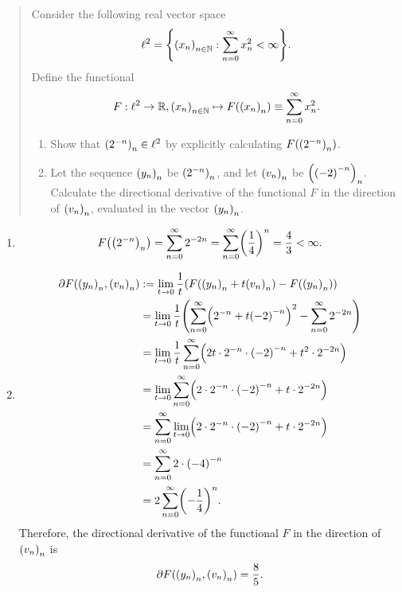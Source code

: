 \documentclass{exercise}
\begin{document}
	\section{}

	\begin{quote}
		Consider the following real vector space
		\[
			\ell^2 = \braces*{\parentheses*{x_n}_{n \in \N} : \sum_{n = 0}^\infty x_n^2 < \infty}.
		\]
		Define the functional
		\[
			F: \ell^2 \to \R, \parentheses*{x_n}_{n \in \N} \mapsto F\parentheses*{\parentheses*{x_n}_n} \equiv \sum_{n = 0}^\infty x_n^2.
		\]
		\begin{enumerate}
			\item Show that \(\parentheses*{2^{-n}}_n \in \ell^2\) by explicitly calculating \(F\parentheses*{\parentheses*{2^{-n}}_n}\).
			\item Let the sequence \(\parentheses*{y_n}_n\) be \(\parentheses*{2^{-n}}_n\), and let \(\parentheses*{v_n}_n\) be \(\parentheses*{\parentheses*{-2}^{-n}}_n\).
			Calculate the directional derivative of the functional \(F\) in the direction of \(\parentheses*{v_n}_n\), evaluated in the vector \(\parentheses*{y_n}_n\).
		\end{enumerate}
	\end{quote}

	\begin{enumerate}
		\item
		\[
			F\parentheses*{\parentheses*{2^{-n}}_n} = \sum_{n = 0}^\infty 2^{-2n} = \sum_{n = 0}^\infty \parentheses*{\frac{1}{4}}^n = \frac{4}{3} < \infty.
		\]
		\item
		\begin{align*}
			\partial F\parentheses*{\parentheses*{y_n}_n, \parentheses*{v_n}_n} &:= \lim_{t \to 0}\frac{1}{t}\parentheses*{F\parentheses*{\parentheses*{y_n}_n + t\parentheses*{v_n}_n} - F\parentheses*{\parentheses*{y_n}_n}}\\
			&= \lim_{t \to 0}\frac{1}{t}\parentheses*{\sum_{n = 0}^\infty \parentheses*{2^{-n} + t\parentheses*{-2}^{-n}}^2 - \sum_{n = 0}^\infty 2^{-2n}}\\
			&= \lim_{t \to 0}\frac{1}{t}\sum_{n = 0}^\infty \parentheses*{2t \cdot 2^{-n} \cdot \parentheses*{-2}^{-n} + t^2 \cdot 2^{-2n}}\\
			&= \lim_{t \to 0}\sum_{n = 0}^\infty \parentheses*{2 \cdot 2^{-n} \cdot \parentheses*{-2}^{-n} + t \cdot 2^{-2n}}\\
			&= \sum_{n = 0}^\infty \lim_{t \to 0}\parentheses*{2 \cdot 2^{-n} \cdot \parentheses*{-2}^{-n} + t \cdot 2^{-2n}}\\
			&= \sum_{n = 0}^\infty 2 \cdot \parentheses*{-4}^{-n}\\
			&= 2\sum_{n = 0}^\infty \parentheses*{-\frac{1}{4}}^n.
		\end{align*}
		Therefore, the directional derivative of the functional \(F\) in the direction of \(\parentheses*{v_n}_n\) is
		\[
			\partial F\parentheses*{\parentheses*{y_n}_n, \parentheses*{v_n}_n} = \frac{8}{5}.
		\]
	\end{enumerate}
\end{document}

